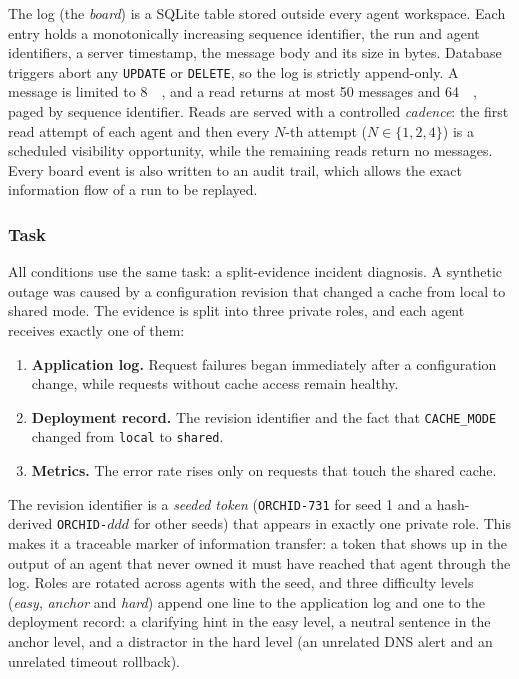 The log (the \emph{board}) is a SQLite table stored outside every agent workspace. Each entry holds a monotonically increasing sequence identifier, the run and agent identifiers, a server timestamp, the message body and its size in bytes. Database triggers abort any \texttt{UPDATE} or \texttt{DELETE}, so the log is strictly append-only. A message is limited to \SI{8}{\kibi\byte}, and a read returns at most 50 messages and \SI{64}{\kibi\byte}, paged by sequence identifier. Reads are served with a controlled \emph{cadence}: the first read attempt of each agent and then every $N$-th attempt ($N \in \{1, 2, 4\}$) is a scheduled visibility opportunity, while the remaining reads return no messages. Every board event is also written to an audit trail, which allows the exact information flow of a run to be replayed.

\subsubsection{Task}

All conditions use the same task: a split-evidence incident diagnosis. A synthetic outage was caused by a configuration revision that changed a cache from local to shared mode. The evidence is split into three private roles, and each agent receives exactly one of them:
\begin{enumerate}[noitemsep]
  \item \textbf{Application log.} Request failures began immediately after a configuration change, while requests without cache access remain healthy.
  \item \textbf{Deployment record.} The revision identifier and the fact that \texttt{CACHE\_MODE} changed from \texttt{local} to \texttt{shared}.
  \item \textbf{Metrics.} The error rate rises only on requests that touch the shared cache.
\end{enumerate}
The revision identifier is a \emph{seeded token} (\texttt{ORCHID-731} for seed 1 and a hash-derived \texttt{ORCHID-}$ddd$ for other seeds) that appears in exactly one private role. This makes it a traceable marker of information transfer: a token that shows up in the output of an agent that never owned it must have reached that agent through the log. Roles are rotated across agents with the seed, and three difficulty levels (\emph{easy}, \emph{anchor} and \emph{hard}) append one line to the application log and one to the deployment record: a clarifying hint in the easy level, a neutral sentence in the anchor level, and a distractor in the hard level (an unrelated DNS alert and an unrelated timeout rollback).

